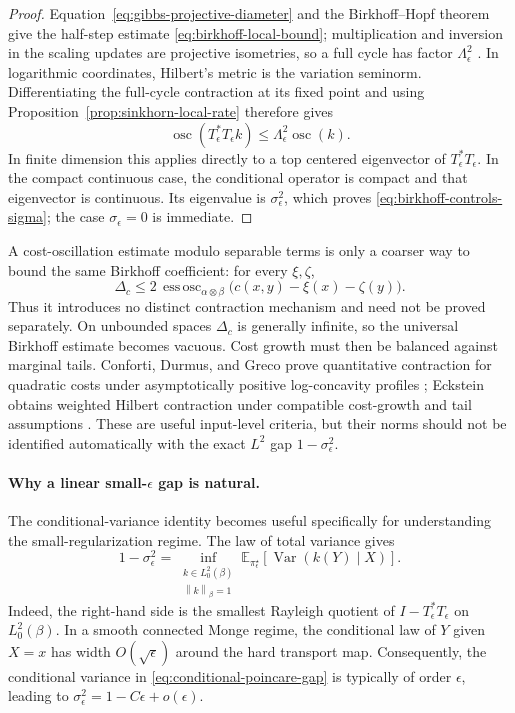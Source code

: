 \documentclass[11pt]{article}
\theoremstyle{definition}
\theoremstyle{remark}
\newcommand{\E}{\mathbb{E}}
\newcommand{\eps}{\epsilon}
\newcommand{\al}{\alpha}
\newcommand{\be}{\beta}
\newcommand{\norm}[1]{\left\lVert #1\right\rVert}
\DeclareMathOperator{\Var}{Var}
\begin{document}
\begin{proof}
Equation~\eqref{eq:gibbs-projective-diameter} and the Birkhoff--Hopf
theorem give the half-step estimate
\eqref{eq:birkhoff-local-bound}; multiplication and inversion in the
scaling updates are projective isometries, so a full cycle has factor
$\Lambda_\eps^2$
\cite{FranklinLorenz1989}. In logarithmic coordinates, Hilbert's metric
is the variation seminorm. Differentiating the full-cycle contraction
at its fixed point and using Proposition~\ref{prop:sinkhorn-local-rate}
therefore gives
\[
  \operatorname{osc}(T_\eps^\ast T_\eps k)
  \leq
  \Lambda_\eps^2\operatorname{osc}(k).
\]
In finite dimension this applies directly to a top centered
eigenvector of $T_\eps^\ast T_\eps$. In the compact continuous case,
the conditional operator is compact and that eigenvector is continuous.
Its eigenvalue is $\sigma_\eps^2$, which proves
\eqref{eq:birkhoff-controls-sigma}; the case $\sigma_\eps=0$ is
immediate.
\end{proof}

A cost-oscillation estimate modulo separable terms is only a coarser
way to bound the same Birkhoff coefficient: for every $\xi,\zeta$,
\[
  \Delta_c
  \leq
  2\,\operatorname{ess\,osc}_{\al\otimes\be}
  \bigl(c(x,y)-\xi(x)-\zeta(y)\bigr).
\]
Thus it introduces no distinct contraction mechanism and need not be
proved separately. On unbounded spaces $\Delta_c$ is generally
infinite, so the universal Birkhoff estimate becomes vacuous. Cost
growth must then be balanced against marginal tails. Conforti, Durmus,
and Greco prove quantitative contraction for quadratic costs under
asymptotically positive log-concavity profiles
\cite{ConfortiDurmusGreco2026}; Eckstein obtains weighted Hilbert
contraction under compatible cost-growth and tail assumptions
\cite{Eckstein2025}. These are useful input-level criteria, but their
norms should not be identified automatically with the exact $L^2$ gap
$1-\sigma_\eps^2$.

\paragraph{Why a linear small-$\eps$ gap is natural.}
The conditional-variance identity becomes useful specifically for
understanding the small-regularization regime. The law of total
variance gives
\begin{equation}
  \label{eq:conditional-poincare-gap}
  1-\sigma_\eps^2
  =
  \inf_{\substack{k\in L_0^2(\be)\\\norm{k}_\be=1}}
  \E_{\pi_\eps^\star}\left[\Var(k(Y)\mid X)\right].
\end{equation}
Indeed, the right-hand side is the smallest Rayleigh quotient of
$I-T_\eps^\ast T_\eps$ on $L_0^2(\be)$. In a smooth connected Monge
regime, the conditional law of $Y$ given $X=x$ has width
$O(\sqrt\eps)$ around the hard transport map. Consequently, the
conditional variance in \eqref{eq:conditional-poincare-gap} is
typically of order $\eps$, leading to
$\sigma_\eps^2=1-C\eps+o(\eps)$.
\end{document}

